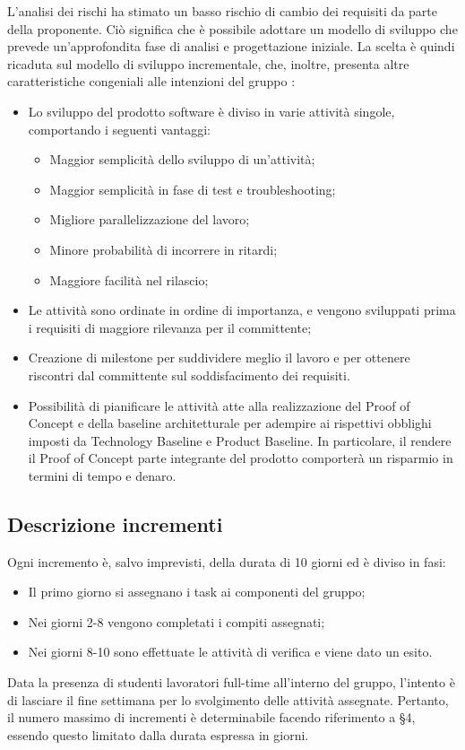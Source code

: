 L'analisi dei rischi ha stimato un basso rischio di cambio dei requisiti da parte della proponente.
Ciò significa che è possibile adottare un modello di sviluppo che prevede un'approfondita fase di 
analisi e progettazione iniziale.
La scelta è quindi ricaduta sul modello di sviluppo incrementale, che, inoltre, presenta altre
caratteristiche congeniali alle intenzioni del gruppo \gruppo \space :
\begin{itemize}
    \item Lo sviluppo del prodotto software è diviso in varie attività singole, comportando i seguenti vantaggi:
    \begin{itemize}
    	\item Maggior semplicità dello sviluppo di un'attività;
    	\item Maggior semplicità in fase di test e {troubleshooting};
    	\item Migliore parallelizzazione del lavoro;
    	\item Minore probabilità di incorrere in ritardi;
    	\item Maggiore facilità nel rilascio;
    \end{itemize}
    \item Le attività sono ordinate in ordine di importanza, e vengono sviluppati prima i requisiti di maggiore rilevanza per il committente;
    \item Creazione di milestone per suddividere meglio il lavoro e per ottenere riscontri dal committente sul soddisfacimento dei requisiti.
    \item Possibilità di pianificare le attività atte alla realizzazione del {Proof of Concept} e della baseline architetturale per adempire ai rispettivi obblighi imposti da {Technology Baseline} e {Product Baseline}. In particolare, il rendere il Proof of Concept parte integrante del prodotto comporterà un risparmio in termini di tempo e denaro.
\end{itemize}

\subsection{Descrizione incrementi}
Ogni incremento è, salvo imprevisti, della durata di 10 giorni ed è diviso in fasi:
\begin{itemize}
\item Il primo giorno si assegnano i task ai componenti del gruppo;
\item Nei giorni 2-8 vengono completati i compiti assegnati;
\item Nei giorni 8-10 sono effettuate le attività di verifica e viene dato un esito.
\end{itemize}
Data la presenza di studenti lavoratori full-time all'interno del gruppo, l'intento è di lasciare il fine settimana per lo svolgimento delle attività assegnate.
Pertanto, il numero massimo di incrementi è determinabile facendo riferimento a §4, essendo questo limitato dalla durata espressa in giorni.